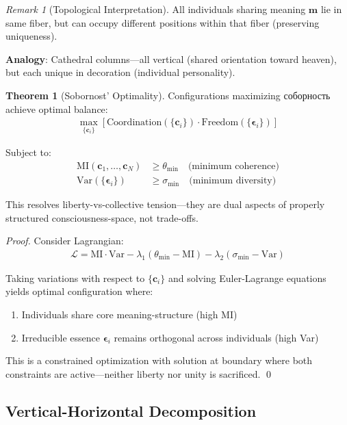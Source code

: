 \documentclass[11pt,a4paper]{article}
\theoremstyle{definition}
\newtheorem{theorem}{Theorem}[section]
\theoremstyle{remark}
\newtheorem{remark}{Remark}[section]
\newcommand{\cc}{\mathbf{c}}
\begin{document}
\begin{small}
\begin{enumerate}
\begin{remark}[Topological Interpretation]
All individuals sharing meaning \(\mathbf{m}\) lie in same fiber, but can occupy different positions within that fiber (preserving uniqueness).

\textbf{Analogy}: Cathedral columns—all vertical (shared orientation toward heaven), but each unique in decoration (individual personality).
\end{remark}

\begin{theorem}[Sobornost' Optimality]
Configurations maximizing соборность achieve optimal balance:
\begin{align}
\max_{\{\cc_i\}} \left[ \text{Coordination}(\{\cc_i\}) \cdot \text{Freedom}(\{\boldsymbol{\epsilon}_i\}) \right]
\end{align}

Subject to:
\begin{align}
\text{MI}(\cc_1, \ldots, \cc_N) &\geq \theta_{\min} \quad \text{(minimum coherence)} \\
\text{Var}(\{\boldsymbol{\epsilon}_i\}) &\geq \sigma_{\min} \quad \text{(minimum diversity)}
\end{align}

This resolves liberty-vs-collective tension—they are dual aspects of properly structured consciousness-space, not trade-offs.
\end{theorem}

\begin{proof}
Consider Lagrangian:
\begin{align}
\mathcal{L} = \text{MI} \cdot \text{Var} - \lambda_1(\theta_{\min} - \text{MI}) - \lambda_2(\sigma_{\min} - \text{Var})
\end{align}

Taking variations with respect to \(\{\cc_i\}\) and solving Euler-Lagrange equations yields optimal configuration where:
\begin{enumerate}
    \item Individuals share core meaning-structure (high MI)
    \item Irreducible essence \(\boldsymbol{\epsilon}_i\) remains orthogonal across individuals (high Var)
\end{enumerate}

This is a constrained optimization with solution at boundary where both constraints are active—neither liberty nor unity is sacrificed. \qed
\end{proof}

\subsection{Vertical-Horizontal Decomposition}


\end{enumerate}
\end{small}
\end{document}
